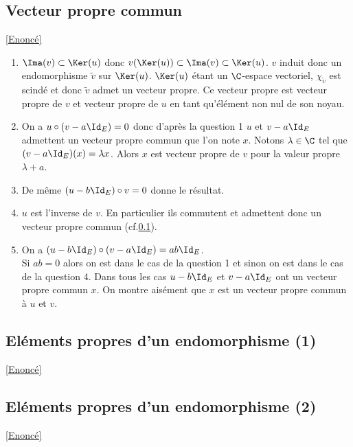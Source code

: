 \documentclass[8pt]{book}
\begin{document}
	\subsection{Vecteur propre commun }
	\label{Vecteur propre commun corrigé}
	\textcolor{blue}{\hyperref[Vecteur propre commun]{[Enoncé]}}\\
	\begin{enumerate}[leftmargin=*]
		\item $\Ima(v)\subset \Ker(u)$ donc $v(\Ker(u))\subset\Ima(v)\subset\Ker(u)$. $v$ induit donc un endomorphisme $\tilde v$ sur $\Ker(u)$. $\Ker(u)$ étant un $\C$-espace vectoriel, $\chi_{\tilde v}$ est scindé et donc $\tilde v$ admet un vecteur propre. Ce vecteur propre est vecteur propre de $v$ et vecteur propre de $u$ en tant qu'élément non nul de son noyau.
		\item On a $u\circ(v-a\Id_E)=0$ donc d'après la question 1 $u$ et $v-a\Id_E$ admettent un vecteur propre commun que l'on note $x$. Notons $\lambda\in \C$ tel que $(v-a\Id_E)(x)=\lambda x$. Alors $x$ est vecteur propre de $v$ pour la valeur propre $\lambda+a$.
		\item De même $(u-b\Id_E)\circ v=0$ donne le résultat.
		\item $u$ est l'inverse de $v$. En particulier ils commutent et admettent donc un vecteur propre commun (cf.\ref{Vecteur propre commun corrigé}).
		\item On a $(u-b\Id_E)\circ (v-a\Id_E)=ab\Id_E$.\\
		Si $ab=0$ alors on est dans le cas de la question 1 et sinon on est dans le cas de la question 4. Dans tous les cas $u-b\Id_E$ et $v-a\Id_E$ ont un vecteur propre commun $x$. On montre aisément que $x$ est un vecteur propre commun à $u$ et $v$.
	\end{enumerate}
	
	\subsection{Eléments propres d'un endomorphisme (1)}
	\label{Eléments propres d'un endomorphismes (1) corrigé}
	\textcolor{blue}{\hyperref[Eléments propres d'un endomorphismes (1)]{[Enoncé]}}\\
	
	
	\subsection{Eléments propres d'un endomorphisme (2)}
	\label{Eléments propres d'un endomorphisme (2) corrigé}
	\textcolor{blue}{\hyperref[Eléments propres d'un endomorphismes (2)]{[Enoncé]}}\\
	
\end{document}
